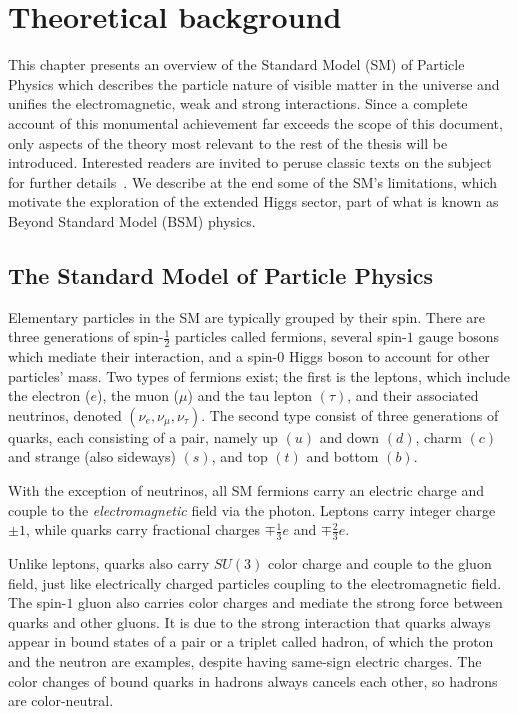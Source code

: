 \chapter{Theoretical background}

This chapter presents an overview of the Standard Model (SM) of Particle Physics which describes the particle nature of visible matter in the universe and unifies the electromagnetic, weak and strong interactions.
Since a complete account of this monumental achievement far exceeds the scope of this document, only aspects of the theory most relevant to the rest of the thesis will be introduced. 
Interested readers are invited to peruse classic texts on the subject for further details~\cite{Peskin_2018, Halzen_Martin_2016, Schwartz_2014}.
We describe at the end some of the SM's limitations, which motivate the exploration of the extended Higgs sector, part of what is known as Beyond Standard Model (BSM) physics.

\section{The Standard Model of Particle Physics}

Elementary particles in the SM are typically grouped by their spin. 
There are three generations of spin-$\frac{1}{2}$ particles called fermions, several spin-$1$ gauge bosons which mediate their interaction, and a spin-$0$ Higgs boson to account for other particles' mass. 
Two types of fermions exist; the first is the leptons, which include the electron ($e$), the muon ($\mu$) and the tau lepton $(\tau)$, and their associated neutrinos, denoted $(\nu_e, \nu_{\mu}, \nu_{\tau})$. 
The second type consist of three generations of quarks, each consisting of a pair, namely up $(u)$ and down $(d)$, charm $(c)$ and strange (also sideways) $(s)$, and top $(t)$ and bottom $(b)$. 

With the exception of neutrinos, all SM fermions carry an electric charge and couple to the \textit{electromagnetic} field via the photon. Leptons carry integer charge $\pm1$, while quarks carry fractional charges $\mp\frac{1}{3}e$ and $\mp\frac{2}{3}e$. 

Unlike leptons, quarks also carry $SU(3)$ color charge and couple to the gluon field, just like electrically charged particles coupling to the electromagnetic field. 
The spin-$1$ gluon also carries color charges and mediate the strong force between quarks and other gluons. 
It is due to the strong interaction that quarks always appear in bound states of a pair or a triplet called hadron, of which the proton and the neutron are examples, despite having same-sign electric charges. 
The color changes of bound quarks in hadrons always cancels each other, so hadrons are color-neutral. 

